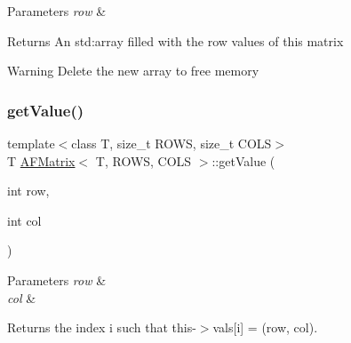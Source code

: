\begin{DoxyParams}{Parameters}
{\em row} & \\
\hline
\end{DoxyParams}
\begin{DoxyReturn}{Returns}
An {\ttfamily std\+:array} filled with the row values of this matrix 
\end{DoxyReturn}
\begin{DoxyWarning}{Warning}
Delete the new array to free memory 
\end{DoxyWarning}
\mbox{\label{class_a_f_matrix_a0e36b5c6f333ac3d6508d5b00c92852c}} 
\subsubsection{\texorpdfstring{get\+Value()}{getValue()}}
{\footnotesize\ttfamily template$<$class T, size\+\_\+t R\+O\+WS, size\+\_\+t C\+O\+LS$>$ \\
T \hyperlink{class_a_f_matrix}{A\+F\+Matrix}$<$ T, R\+O\+WS, C\+O\+LS $>$\+::get\+Value (\begin{DoxyParamCaption}\item[{int}]{row,  }\item[{int}]{col }\end{DoxyParamCaption})\hspace{0.3cm}{\ttfamily [inline]}}


\begin{DoxyParams}{Parameters}
{\em row} & \\
\hline
{\em col} & \\
\hline
\end{DoxyParams}
\begin{DoxyReturn}{Returns}
the index {\ttfamily i} such that {\ttfamily this-\/$>$vals\mbox{[}i\mbox{]} = (row, col)}. 
\end{DoxyReturn}
\mbox{\label{class_a_f_matrix_a2c3183f964593d1bc52f6dc09429dbcc}} 
